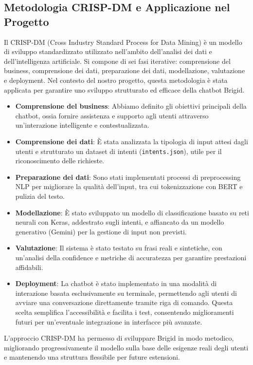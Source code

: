 \documentclass[12pt, letterpaper]{article}
\begin{document}
\subsection{Metodologia CRISP-DM e Applicazione nel Progetto}
Il CRISP-DM (Cross Industry Standard Process for Data Mining) è un modello di sviluppo standardizzato utilizzato nell’ambito dell’analisi dei dati e dell’intelligenza artificiale. Si compone di sei fasi iterative: comprensione del business, comprensione dei dati, preparazione dei dati, modellazione, valutazione e deployment. Nel contesto del nostro progetto, questa metodologia è stata applicata per garantire uno sviluppo strutturato ed efficace della chatbot Brigid.
\begin{itemize}
\item \textbf{Comprensione del business}: Abbiamo definito gli obiettivi principali della chatbot, ossia fornire assistenza e supporto agli utenti attraverso un’interazione intelligente e contestualizzata.
\item \textbf{Comprensione dei dati}: È stata analizzata la tipologia di input attesi dagli utenti e strutturato un dataset di intenti (\texttt{intents.json}), utile per il riconoscimento delle richieste.
\item \textbf{Preparazione dei dati}: Sono stati implementati processi di preprocessing NLP per migliorare la qualità dell’input, tra cui tokenizzazione con BERT e pulizia del testo.
\item \textbf{Modellazione}: È stato sviluppato un modello di classificazione basato su reti neurali con Keras, addestrato sugli intenti, e affiancato da un modello generativo (Gemini) per la gestione di input non previsti.
\item \textbf{Valutazione}: Il sistema è stato testato su frasi reali e sintetiche, con un’analisi della confidence e metriche di accuratezza per garantire prestazioni affidabili.
\item \textbf{Deployment}: La chatbot è stato implementato in una modalità di interazione basata esclusivamente su terminale, permettendo agli utenti di avviare una conversazione direttamente tramite riga di comando. Questa scelta semplifica l’accessibilità e facilita i test, consentendo miglioramenti futuri per un’eventuale integrazione in interfacce più avanzate.
\end{itemize}
L’approccio CRISP-DM ha permesso di sviluppare Brigid in modo metodico, migliorando progressivamente il modello sulla base delle esigenze reali degli utenti e mantenendo una struttura flessibile per future estensioni.
\end{document}
